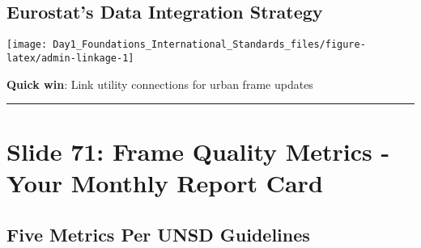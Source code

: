 \documentclass[
]{article}
\begin{document}
\subsection{Eurostat's Data Integration
Strategy}\label{eurostats-data-integration-strategy}

\texttt{[image: Day1\_Foundations\_International\_Standards\_files/figure-latex/admin-linkage-1]}

\textbf{Quick win}: Link utility connections for urban frame updates

\begin{center}\rule{0.5\linewidth}{0.5pt}\end{center}

\section{Slide 71: Frame Quality Metrics - Your Monthly Report
Card}\label{slide-71-frame-quality-metrics---your-monthly-report-card}

\subsection{Five Metrics Per UNSD
Guidelines}\label{five-metrics-per-unsd-guidelines}
\end{document}
